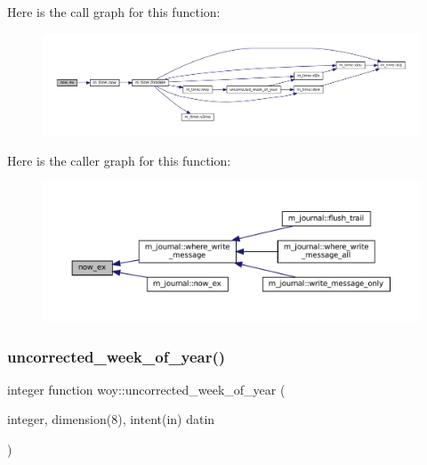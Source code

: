 Here is the call graph for this function\+:\nopagebreak
\begin{figure}[H]
\begin{center}
\leavevmode
\includegraphics[width=350pt]{M__journal_8f90_a09223e2da0c23850fad035407582fd68_cgraph}
\end{center}
\end{figure}
Here is the caller graph for this function\+:\nopagebreak
\begin{figure}[H]
\begin{center}
\leavevmode
\includegraphics[width=350pt]{M__journal_8f90_a09223e2da0c23850fad035407582fd68_icgraph}
\end{center}
\end{figure}
\mbox{\label{M__journal_8f90_a41382743ce1b42e02a3f42146e3fa53f}} 
\subsubsection{\texorpdfstring{uncorrected\+\_\+week\+\_\+of\+\_\+year()}{uncorrected\_week\_of\_year()}}
{\footnotesize\ttfamily integer function woy\+::uncorrected\+\_\+week\+\_\+of\+\_\+year (\begin{DoxyParamCaption}\item[{integer, dimension(8), intent(in)}]{datin }\end{DoxyParamCaption})\hspace{0.3cm}{\ttfamily [private]}}



